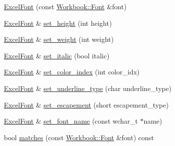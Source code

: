 \begin{DoxyCompactItemize}
\item 
\hyperlink{struct_excel_format_1_1_excel_font_affa5cb83d9b5be05ef394acd8452073b}{Excel\+Font} (const \hyperlink{struct_y_excel_1_1_workbook_1_1_font}{Workbook\+::\+Font} \&font)
\item 
\hyperlink{struct_excel_format_1_1_excel_font}{Excel\+Font} \& \hyperlink{struct_excel_format_1_1_excel_font_ad9eda977cf0f19737925b9dd738f0445}{set\+\_\+height} (int height)
\item 
\hyperlink{struct_excel_format_1_1_excel_font}{Excel\+Font} \& \hyperlink{struct_excel_format_1_1_excel_font_ae6457b21735f17cb6c24c1759e6aeecc}{set\+\_\+weight} (int weight)
\item 
\hyperlink{struct_excel_format_1_1_excel_font}{Excel\+Font} \& \hyperlink{struct_excel_format_1_1_excel_font_a893e59f906e610c249df9484bb6529dd}{set\+\_\+italic} (bool italic)
\item 
\hyperlink{struct_excel_format_1_1_excel_font}{Excel\+Font} \& \hyperlink{struct_excel_format_1_1_excel_font_a4f8bdbec4f4b32407fe678c9604bafe9}{set\+\_\+color\+\_\+index} (int color\+\_\+idx)
\item 
\hyperlink{struct_excel_format_1_1_excel_font}{Excel\+Font} \& \hyperlink{struct_excel_format_1_1_excel_font_ad51c538a26b70365f8712e84395656bd}{set\+\_\+underline\+\_\+type} (char underline\+\_\+type)
\item 
\hyperlink{struct_excel_format_1_1_excel_font}{Excel\+Font} \& \hyperlink{struct_excel_format_1_1_excel_font_a45ed6e358dee2e5863b983b6c17cb952}{set\+\_\+escapement} (short escapement\+\_\+type)
\item 
\hyperlink{struct_excel_format_1_1_excel_font}{Excel\+Font} \& \hyperlink{struct_excel_format_1_1_excel_font_a5351eb021de4e91a78c46fd914fb78be}{set\+\_\+font\+\_\+name} (const wchar\+\_\+t $\ast$name)
\item 
bool \hyperlink{struct_excel_format_1_1_excel_font_a2c5de250568466dbbcad3d2ef1460388}{matches} (const \hyperlink{struct_y_excel_1_1_workbook_1_1_font}{Workbook\+::\+Font} \&font) const 
\end{DoxyCompactItemize}
